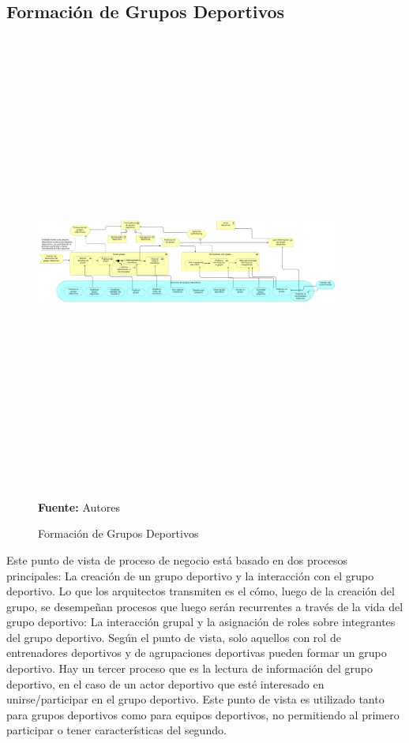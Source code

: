 \subsection{Formación de Grupos Deportivos}

\begin{figure}[!htb]
  \begin{center}
    \includegraphics[angle=90,width=10cm,height=15cm]{./imagenes/Archimate/vistas/business_process/formaciongruposdeportivos.png}
    \caption{Formación de Grupos Deportivos}
    \label{fig:bp_formacion_grupos_deportivos}
    \textbf{Fuente:}  Autores \\
  \end{center}
\end{figure}

Este punto de vista de proceso de negocio está basado en dos procesos principales: La creación de un grupo deportivo y la interacción con el grupo deportivo. Lo que los arquitectos transmiten es el cómo, luego de la creación del grupo, se desempeñan procesos que luego serán recurrentes a través de la vida del grupo deportivo: La interacción grupal y la asignación de roles sobre integrantes del grupo deportivo. Según el punto de vista, solo aquellos con rol de entrenadores deportivos y de agrupaciones deportivas pueden formar un grupo deportivo. Hay un tercer proceso que es la lectura de información del grupo deportivo, en el caso de un actor deportivo que esté interesado en unirse/participar en el grupo deportivo. Este punto de vista es utilizado tanto para grupos deportivos como para equipos deportivos, no permitiendo al primero participar o tener características del segundo.

